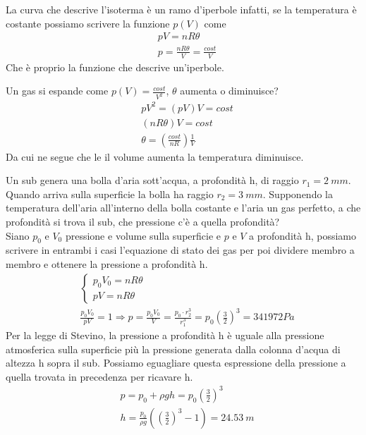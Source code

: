 \documentclass[
10pt, %
a4paper, %
oneside, %
headinclude,footinclude, %
BCOR5mm, %
]{scrartcl}
\begin{document}
\FloatBarrier
La curva che descrive l'isoterma è un ramo d'iperbole infatti, se la temperatura è costante possiamo scrivere la funzione $p(V)$ come
\begin{align*} 
	&p V  = nR\theta \\
	&p = \frac{n R \theta}{V} = \frac{cost}{V}
\end{align*} 
Che è proprio la funzione che descrive un'iperbole.
\begin{exercise}
	Un gas si espande come $p(V) = \frac{cost}{V^2}$, $\theta$ aumenta o diminuisce? 
	\begin{align*} 
		&p V^2 = \left(p V \right) V = cost\\
		&\left(n R \theta\right) V = cost\\
		& \theta = \left(\frac{cost}{n R}\right)\frac{1}{V}
	\end{align*}  
	Da cui ne segue che le il volume aumenta la temperatura diminuisce.
\end{exercise}
\begin{exercise}
	Un sub genera una bolla d'aria sott'acqua, a profondità h, di raggio $r_1 = 2\ mm$. Quando arriva sulla superficie la bolla ha raggio $r_2 = 3\ mm$. Supponendo la temperatura dell'aria all'interno della bolla costante e l'aria un gas perfetto, a che profondità si trova il sub, che pressione c'è a quella profondità?\\
	Siano $p_0$ e $V_0$ pressione e volume sulla superficie e $p$ e $V$ a profondità h, possiamo scrivere in entrambi i casi l'equazione di stato dei gas per poi dividere membro a membro e ottenere la pressione a profondità h. 
	\begin{align*} 
		&\begin{cases}
			p_0 V_0 = n R \theta\\
			pV = nR\theta
		\end{cases}\\
		&\frac{p_0 V_0}{p V}=1 \Rightarrow p = \frac{p_0 V_0}{V} = \frac{p_0 \cdot r_2^3}{r_1^3} = p_0 \left(\frac{3}{2}\right)^3 = 341972 Pa
	\end{align*} 
	Per la legge di Stevino, la pressione a profondità h è uguale alla pressione atmosferica sulla superficie più la pressione generata dalla colonna d'acqua di altezza h sopra il sub. Possiamo eguagliare questa espressione della pressione a quella trovata in precedenza per ricavare h.
	\begin{align*} 
		&p = p_0 + \rho g h = p_0 \left(\frac{3}{2}\right)^3\\
		&h =\frac{p_0}{\rho g} \left(\left(\frac{3}{2}\right)^3 - 1\right) = 24.53\ m 
	\end{align*} 
\end{exercise}
\end{document}
